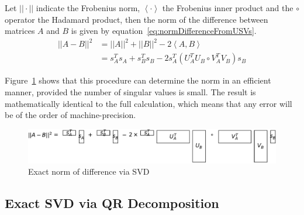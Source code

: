 \documentclass{acm_proc_article-sp}
\begin{document}
Let $|| \cdot ||$ indicate the Frobenius norm, $\left\langle \cdot \right\rangle$ the Frobenius inner product and the $\circ$ operator the Hadamard product, then the norm of the difference between matrices $A$ and $B$ is given by equation~\ref{eq:normDifferenceFromUSVs}.
\begin{equation}
\label{eq:normDifferenceFromUSVs}
\begin{split}
||A-B||^{2} & = ||A||^{2} + ||B||^{2} - 2 \left\langle A, B \right\rangle \\
& = s_{A}^{T} s_{A} + s_{B}^{T} s_{B} - 2 s_{A}^{T} \left( U_{A}^{T} U_{B} \circ V_{A}^{T} V_{B} \right) s_{B}
\end{split}
\end{equation}

Figure~\ref{fig:normDifferenceFromUSVs} shows that this procedure can determine the norm in an efficient manner, provided the number of singular values is small. The result is mathematically identical to the full calculation, which means that any error will be of the order of machine-precision.

\begin{figure}[h]
\begin{center}
\includegraphics[width=\columnwidth]{Results/normDifferenceFromUSVs.pdf}
\caption[Exact norm of difference]{Exact norm of difference via SVD}
\label{fig:normDifferenceFromUSVs}
\end{center}
\end{figure}

\subsection{Exact SVD via QR Decomposition}
\label{sec:Techniques Exact SVD via QR Decomposition}
\end{document}
